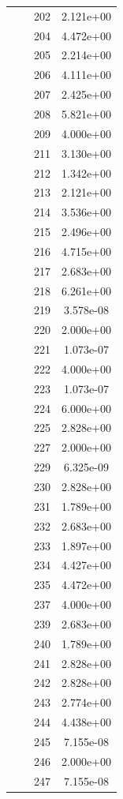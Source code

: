 \documentclass[12pt]{article}
\begin{document}
\begin{longtable}{@{}cccc@{}}
 &  & 202 & 2.121e+00 \\
 &  & 204 & 4.472e+00 \\
 &  & 205 & 2.214e+00 \\
 &  & 206 & 4.111e+00 \\
 &  & 207 & 2.425e+00 \\
 &  & 208 & 5.821e+00 \\
 &  & 209 & 4.000e+00 \\
 &  & 211 & 3.130e+00 \\
 &  & 212 & 1.342e+00 \\
 &  & 213 & 2.121e+00 \\
 &  & 214 & 3.536e+00 \\
 &  & 215 & 2.496e+00 \\
 &  & 216 & 4.715e+00 \\
 &  & 217 & 2.683e+00 \\
 &  & 218 & 6.261e+00 \\
 &  & 219 & 3.578e-08 \\
 &  & 220 & 2.000e+00 \\
 &  & 221 & 1.073e-07 \\
 &  & 222 & 4.000e+00 \\
 &  & 223 & 1.073e-07 \\
 &  & 224 & 6.000e+00 \\
 &  & 225 & 2.828e+00 \\
 &  & 227 & 2.000e+00 \\
 &  & 229 & 6.325e-09 \\
 &  & 230 & 2.828e+00 \\
 &  & 231 & 1.789e+00 \\
 &  & 232 & 2.683e+00 \\
 &  & 233 & 1.897e+00 \\
 &  & 234 & 4.427e+00 \\
 &  & 235 & 4.472e+00 \\
 &  & 237 & 4.000e+00 \\
 &  & 239 & 2.683e+00 \\
 &  & 240 & 1.789e+00 \\
 &  & 241 & 2.828e+00 \\
 &  & 242 & 2.828e+00 \\
 &  & 243 & 2.774e+00 \\
 &  & 244 & 4.438e+00 \\
 &  & 245 & 7.155e-08 \\
 &  & 246 & 2.000e+00 \\
 &  & 247 & 7.155e-08 \\

\end{longtable}
\end{document}
